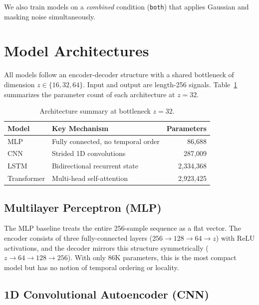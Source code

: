\documentclass{article}
\begin{document}
We also train models on a \textit{combined} condition (\texttt{both}) that applies Gaussian
and masking noise simultaneously.

\section{Model Architectures}

All models follow an encoder-decoder structure with a shared bottleneck of dimension
$z \in \{16, 32, 64\}$. Input and output are length-256 signals.
Table~\ref{tab:params} summarizes the parameter count of each architecture at $z = 32$.

\begin{table}[t]
\caption{Architecture summary at bottleneck $z = 32$.}
\label{tab:params}
\begin{center}
\begin{tabular}{llr}
\toprule
\textbf{Model} & \textbf{Key Mechanism} & \textbf{Parameters} \\
\midrule
MLP         & Fully connected, no temporal order & 86{,}688 \\
CNN         & Strided 1D convolutions            & 287{,}009 \\
LSTM        & Bidirectional recurrent state      & 2{,}334{,}368 \\
Transformer & Multi-head self-attention          & 2{,}923{,}425 \\
\bottomrule
\end{tabular}
\end{center}
\end{table}

\subsection{Multilayer Perceptron (MLP)}

The MLP baseline treats the entire 256-sample sequence as a flat vector. The encoder
consists of three fully-connected layers ($256 \to 128 \to 64 \to z$) with ReLU
activations, and the decoder mirrors this structure symmetrically ($z \to 64 \to 128 \to
256$). With only 86K parameters, this is the most compact model but has no notion of
temporal ordering or locality.

\subsection{1D Convolutional Autoencoder (CNN)}
\end{document}
